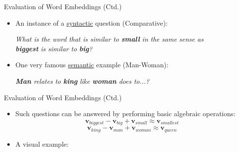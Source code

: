 \begin{frame}{Evaluation of Word Embeddings (Ctd.)}{}
	\begin{itemize}
		\item An instance of a \underline{syntactic} question (Comparative):
		\vspace*{2mm}
		\begin{center}
			\textit{What is the word that is similar to \textbf{small} in the same sense as \\
			\textbf{biggest} is similar to \textbf{big}?}
		\end{center}
		\vspace*{2mm}
		\item One very famous \underline{semantic} example (Man-Woman):
		\vspace*{2mm}
		\begin{center}
			\textit{\textbf{Man} relates to \textbf{king} like \textbf{woman} does to...?}
		\end{center}
	\end{itemize}
\end{frame}


\begin{frame}{Evaluation of Word Embeddings (Ctd.)}{}
	\begin{itemize}
		\item Such questions can be answered by performing basic algebraic operations:
		\begin{equation*}
			\bm{v}_{biggest} - \bm{v}_{big} + \bm{v}_{small} \approx \bm{v}_{smallest}
		\end{equation*}
		\begin{equation*}
			\bm{v}_{king} - \bm{v}_{man} + \bm{v}_{woman} \approx \bm{v}_{queen}
		\end{equation*}
		\item A visual example:
		
	\end{itemize}
\end{frame}


